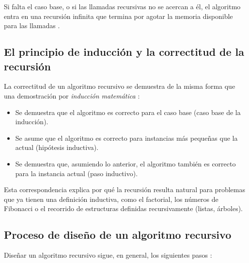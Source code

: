 \documentclass{article}
\begin{document}
Si falta el caso base, o si las llamadas recursivas no se acercan a él, el
algoritmo entra en una recursión infinita que termina por agotar la memoria
disponible para las llamadas \citep{brassardbratley1996}.
 
\subsection{El principio de inducción y la correctitud de la recursión}
 
La correctitud de un algoritmo recursivo se demuestra de la misma forma que
una demostración por \textit{inducción matemática} \citep{clrs}:
 
\begin{itemize}
  \item Se demuestra que el algoritmo es correcto para el caso base (caso
        base de la inducción).
  \item Se asume que el algoritmo es correcto para instancias más pequeñas
        que la actual (hipótesis inductiva).
  \item Se demuestra que, asumiendo lo anterior, el algoritmo también es
        correcto para la instancia actual (paso inductivo).
\end{itemize}
 
Esta correspondencia explica por qué la recursión resulta natural para
problemas que ya tienen una definición inductiva, como el factorial, los
números de Fibonacci o el recorrido de estructuras definidas recursivamente
(listas, árboles).
 
\subsection{Proceso de diseño de un algoritmo recursivo}
 
Diseñar un algoritmo recursivo sigue, en general, los siguientes pasos
\citep{levitin2012}:
 
\end{document}
